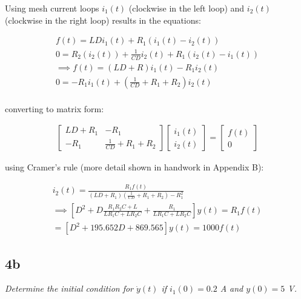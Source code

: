 \documentclass[10pt, AMS Euler]{article}
\begin{document}
Using mesh current loops $i_1(t)$ (clockwise in the left loop) and $i_2(t)$ (clockwise in the right loop) results in the equations: 
\begin{center}
    \begin{align*}
        f(t) = LDi_1(t) + R_1(i_1(t) - i_2(t))\\
        0 = R_2(i_2(t)) + \frac{1}{CD}i_2(t) + R_1(i_2(t) - i_1(t))\\
        \implies f(t) = (LD + R) i_1(t) - R_1i_2(t)\\
        0 = -R_1i_1(t) + (\frac{1}{CD} + R_1 + R_2)i_2(t)\\
    \end{align*}
\end{center}

converting to matrix form: 
\begin{center}
    \begin{align*}
        \begin{bmatrix}
        LD + R_1 & -R_1\\
        -R_1 & \frac{1}{CD} + R_1 + R_2
        \end{bmatrix}
        \begin{bmatrix}
        i_1(t)\\
        i_2(t)
        \end{bmatrix} = 
        \begin{bmatrix}
        f(t)\\
        0
        \end{bmatrix}
    \end{align*}
\end{center}

using Cramer's rule (more detail shown in handwork in Appendix B):
\begin{center}
    \begin{align*}
        i_2(t) = \frac{R_1f(t)}{(LD+R_1)(\frac{1}{CD} + R_1 + R_2) - R_1^2}\\
        \implies \left[ D^2 + D\frac{R_1R_2C + L}{LR_1C + LR_2C} + \frac{R_1}{LR_1C + LR_2C} \right]y(t) = R_1f(t)\\
        = \left[ D^2 + 195.652D + 869.565 \right]y(t) = 1000f(t)
    \end{align*}
\end{center}

\subsection*{4b}
\textit{Determine the initial condition for $\dot{y}(t)$ if $i_1(0) = 0.2$ A and $y(0) = 5$ V.}\\
\end{document}
